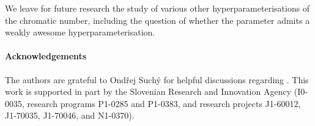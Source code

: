\documentclass[11pt]{article}
\theoremstyle{plain}
\theoremstyle{definition}
\theoremstyle{remark}
\numberwithin{equation}{section}
\begin{document}
We leave for future research the study of various other hyperparameterisations of the chromatic number, including the question of whether the parameter admits a weakly awesome hyperparameterisation.

\paragraph{Acknowledgements}

The authors are grateful to Ond\v{r}ej Such\'y for helpful discussions regarding .
This work is supported in part by the Slovenian Research and Innovation Agency (I0-0035, research programs P1-0285 and P1-0383, and research projects J1-60012, J1-70035, J1-70046, and N1-0370).

\printbibliography
\end{document}

